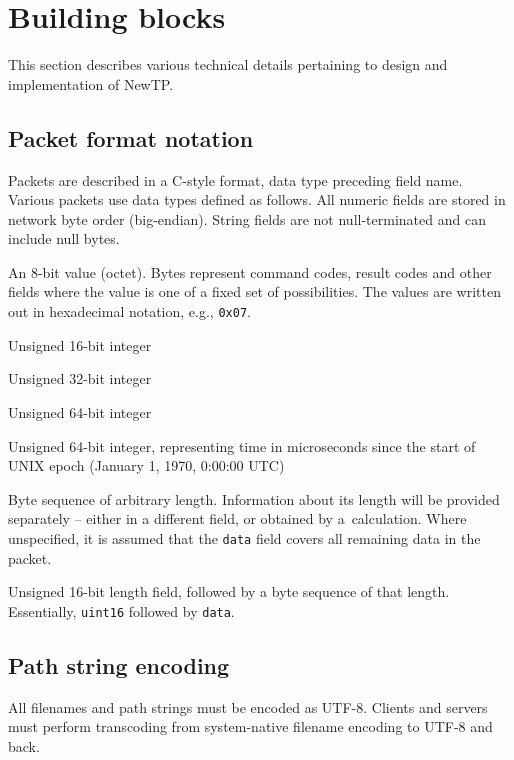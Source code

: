 
\section{Building blocks}

This section describes various technical details pertaining to design and implementation of NewTP.

%

\subsection{Packet format notation}

Packets are described in a C-style format, data type preceding field name. Various packets use data types
defined as follows. All numeric fields are stored in network byte order (big-endian). String fields are not
null-terminated and can include null bytes.

\def\ttitem#1{ \item[\ttfamily #1] }
\begin{description}[leftmargin=1.7cm,style=sameline]
	\ttitem{byte} An 8-bit value (octet). Bytes represent command codes, result codes and other fields
		where the value is one of a fixed set of possibilities. The values are written out in
		hexadecimal notation, e.g., {\tt 0x07}.
	\ttitem{uint16} Unsigned 16-bit integer
	\ttitem{uint32} Unsigned 32-bit integer
	\ttitem{uint64} Unsigned 64-bit integer
	\ttitem{time\_t} Unsigned 64-bit integer, representing time in microseconds since the start of UNIX
		epoch (January 1, 1970, 0:00:00 UTC)
	\ttitem{data} Byte sequence of arbitrary length. Information about its length will be provided
		separately -- either in a different field, or obtained by a~calculation. Where unspecified, it
		is assumed that the {\tt data} field covers all remaining data in the packet.
	\ttitem{string} Unsigned 16-bit length field, followed by a byte sequence of that length. Essentially,
		{\tt uint16} followed by {\tt data}.
\end{description}

%

\subsection{Path string encoding}

All filenames and path strings must be encoded as UTF-8. Clients and servers must perform transcoding from
system-native filename encoding to UTF-8 and back.

